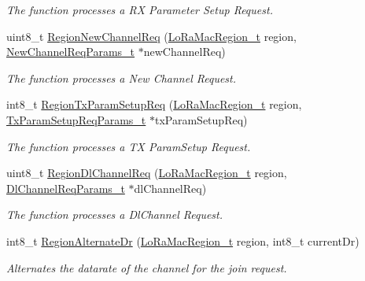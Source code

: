 \begin{DoxyCompactItemize}
\begin{DoxyCompactList}\small\item\em The function processes a RX Parameter Setup Request. \end{DoxyCompactList}\item 
uint8\+\_\+t \mbox{\hyperlink{group___r_e_g_i_o_n_gadca654538335b4395c8d54642b83e2d4}{Region\+New\+Channel\+Req}} (\mbox{\hyperlink{group___l_o_r_a_m_a_c_ga80c48efda9ae02e14b58160d34a798dd}{Lo\+Ra\+Mac\+Region\+\_\+t}} region, \mbox{\hyperlink{group___r_e_g_i_o_n_gae2abcdb6dbb843c9faf5fd3009eca9d6}{New\+Channel\+Req\+Params\+\_\+t}} $\ast$new\+Channel\+Req)
\begin{DoxyCompactList}\small\item\em The function processes a New Channel Request. \end{DoxyCompactList}\item 
int8\+\_\+t \mbox{\hyperlink{group___r_e_g_i_o_n_ga50dbaca7bf982330c183614302d525c4}{Region\+Tx\+Param\+Setup\+Req}} (\mbox{\hyperlink{group___l_o_r_a_m_a_c_ga80c48efda9ae02e14b58160d34a798dd}{Lo\+Ra\+Mac\+Region\+\_\+t}} region, \mbox{\hyperlink{group___r_e_g_i_o_n_ga26836ef2996e70410e42ef471073f855}{Tx\+Param\+Setup\+Req\+Params\+\_\+t}} $\ast$tx\+Param\+Setup\+Req)
\begin{DoxyCompactList}\small\item\em The function processes a TX Param\+Setup Request. \end{DoxyCompactList}\item 
uint8\+\_\+t \mbox{\hyperlink{group___r_e_g_i_o_n_ga54f7c22677b2d0628e9914f53501d4b8}{Region\+Dl\+Channel\+Req}} (\mbox{\hyperlink{group___l_o_r_a_m_a_c_ga80c48efda9ae02e14b58160d34a798dd}{Lo\+Ra\+Mac\+Region\+\_\+t}} region, \mbox{\hyperlink{group___r_e_g_i_o_n_gae0d608ff1f8ea0a430e4f9a4c38ec7f3}{Dl\+Channel\+Req\+Params\+\_\+t}} $\ast$dl\+Channel\+Req)
\begin{DoxyCompactList}\small\item\em The function processes a Dl\+Channel Request. \end{DoxyCompactList}\item 
int8\+\_\+t \mbox{\hyperlink{group___r_e_g_i_o_n_ga28f24373a279e7665ceb6cd4be30f558}{Region\+Alternate\+Dr}} (\mbox{\hyperlink{group___l_o_r_a_m_a_c_ga80c48efda9ae02e14b58160d34a798dd}{Lo\+Ra\+Mac\+Region\+\_\+t}} region, int8\+\_\+t current\+Dr)
\begin{DoxyCompactList}\small\item\em Alternates the datarate of the channel for the join request. \end{DoxyCompactList}\item 

\end{DoxyCompactItemize}
